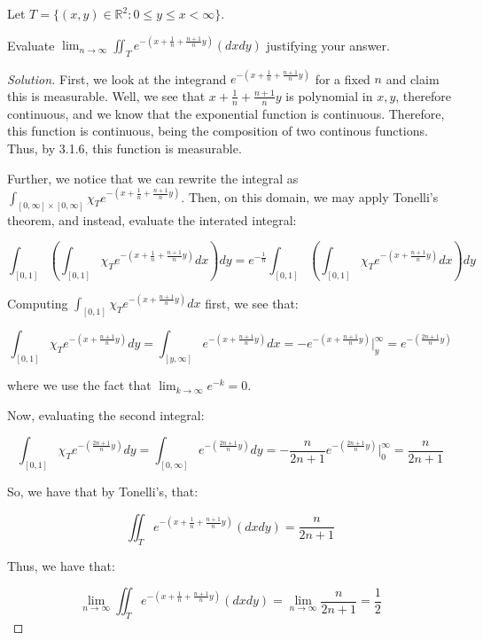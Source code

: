 \documentclass[10pt]{article}
\newenvironment{problem}[2][Problem]{\begin{trivlist}
\item[\hskip \labelsep {\bfseries #1}\hskip \labelsep {\bfseries #2.}]}{\end{trivlist}}
\begin{document}
\begin{problem}{2}

Let $T = \{ (x,y) \in \mathbb{R}^2 : 0 \leq y \leq x < \infty \}$.

Evaluate $\lim_{n \to \infty} \iint_T e^{-(x + \frac{1}{n} + \frac{n+1}{n} y)} (dxdy)$ justifying your answer.

\end{problem}
\begin{proof}[Solution]

First, we look at the integrand  $e^{-(x + \frac{1}{n} + \frac{n+1}{n} y)}$ for a fixed $n$ and claim this is measurable. Well, we see that $ x + \frac{1}{n} + \frac{n+1}{n} y$ is polynomial in $x,y$, therefore continuous, and we know that the exponential function is continuous. Therefore, this function is continuous, being the composition of two continous functions. Thus, by 3.1.6, this function is measurable. 

Further, we notice that we can rewrite the integral as $\int_{[0,\infty] \times [0, \infty]} \chi_{T} e^{-(x + \frac{1}{n} + \frac{n+1}{n} y)}$. Then, on this domain, we may apply Tonelli's theorem, and instead, evaluate the interated integral:

$$ \int_{[0,1]} \left( \int_{[0,1]} \chi_{T} e^{-(x + \frac{1}{n}+ \frac{n+1}{n} y)} dx\right) dy = e^{-\frac{1}{n}}  \int_{[0,1]} \left( \int_{[0,1]} \chi_{T} e^{-(x + \frac{n+1}{n} y)} dx\right) dy $$

Computing $\int_{[0,1]} \chi_{T} e^{-(x + \frac{n+1}{n} y)} dx$ first, we see that:

$$ \int_{[0,1]} \chi_{T} e^{-(x  + \frac{n+1}{n} y)} dy = \int_{[y,\infty]} e^{-(x + \frac{n+1}{n} y)} dx = -  e^{-(x + \frac{n+1}{n} y)} \Big|_y^\infty =  e^{-( \frac{2n+1}{n} y)}$$

where we use the fact that $\lim_{k \to \infty} e^{-k} = 0$. 

Now, evaluating the second integral:

$$\int_{[0,1]} \chi_T e^{-( \frac{2n+1}{n} y)} dy = \int_{[0,\infty]} e^{-( \frac{2n+1}{n} y)} dy = -\frac{n}{2n+1}  e^{-( \frac{2n+1}{n} y)} \Big|_0^\infty = \frac{n}{2n+1}$$

So, we have that by Tonelli's, that:

$$ \iint_T e^{-(x + \frac{1}{n} + \frac{n+1}{n} y)} (dxdy) = \frac{n}{2n+1}$$

Thus, we have that:

$$\lim_{n \to \infty} \iint_T e^{-(x + \frac{1}{n} + \frac{n+1}{n} y)} (dxdy) = \lim_{n \to \infty} \frac{n}{2n+1} = \frac{1}{2} $$



\end{proof}
\end{document}
